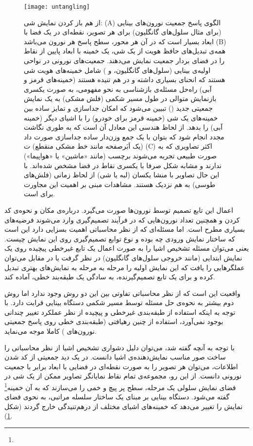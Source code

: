 \begin{figure}
\centering
{\footnotesize
\texttt{[image: untangling]}
\caption[از هم باز کردن نمایش شی]{از هم باز کردن نمایش شی: (A) الگوی پاسخ جمعیت نورون‌های بینایی (برای مثال سلول‌های گانگلیون) برای هر تصویر، نقطه‌ای در یک فضا با ابعاد بسیار است که در آن هر محور، سطح پاسخ هر نورون می‌باشد
(B) همه‌ی تبدیل‌های حافظ هویت از یک شی، یک خمینه با ابعاد پایین از نقاط را در فضای بردار جمعیت نمایش می‌دهند. جمعیت‌های نورونی در نواحی اولیه‌ی بینایی (سلول‌های گانگلیون،  و ) شامل خمینه‌های هویت شی هستند که انحنای بسیاری داشته و در هم تنیده هستند (خمینه‌های قرمز و آبی) راه‌حل مسئله‌ی بازشناسی به نحو مفهومی، به صورت یکسری بازنمایش متوالی در طول مسیر شکمی (فلش مشکی) به یک نمایش جمعیتی جدید () تبیین می‌شود که امکان جداسازی و تمایز ساده بین خمینه‌های یک شی (خمینه قرمز برای خودرو) را با اشیای دیگر (خمینه آبی) را بدهد. از لحاظ هندسی این معادل آن است که به طوری نگاشت مجدد انجام شود که بتوان با یک جمع وزن‌دار ساده جداسازی صورت داد (یک اَبَرصفحه مانند خط مشکی منقطع) ت
(C) اکثر تصاویری که به صورت طبیعی تجربه می‌شوند برچسب (مانند «ماشین» یا «هواپیما») ندارند و مشابه شکل صرفا با یکسری نقاط در فضا مشخص شده‌اند. با این حال تصاویر با منشا یکسان (لبه یا شی) از لحاظ زمانی (فلش‌های طوسی) به هم نزدیک هستند. مشاهدات مبنی بر اهمیت این مجاورت برای  است.\cite{dicarlo2012does}}
\label{fig:untangling}
}
\end{figure}

اعمال این تابع تصمیم توسط نورون‌ها صورت می‌گیرد. درباره‌ی مکان و نحوه‌ی کد کردن و همچنین تعداد نورون‌هایی که در فرآیند تصمیم‌گیری وارد می‌شوند فرضیه‌های بسیاری مطرح است. اما مسئله‌ای که از نظر محاسباتی اهمیت بسزایی دارد این است که ساختار نمایش ورودی چه بوده و نوع توابع تصمیم‌گیری روی این نمایش چیست. یعنی می‌توان مسئله تشخیص اشیا را به صورت اعمال یک تابع غیرخطی پیچیده روی یک نمایش ابتدایی (مانند خروجی سلول‌های گانگلیون) در نظر گرفت یا در مقابل می‌توان عملگرهایی را یافت که این نمایش اولیه را مرحله به مرحله به نمایش‌های بهتری تبدیل کرده و برای یک تابع تصمیم‌گیرنده، به سادگی یک طبقه‌بند خطی، آماده کند.

واقعیت این است که از نظر محاسباتی تفاوتی بین این دو روش وجود ندارد اما روش دوم بیشتر به نحوه‌ی حل مسئله توسط مسیر شکمی دستگاه بینایی قرابت دارد. با توجه به اینکه استفاده از طبقه‌بندی غیرخطی و پیچیده از نظر عملکرد تغییر چندانی بوجود نمی‌آورد، استفاده از چنین رهیافتی (طبقه‌بندی خطی روی پاسخ جمعیتی نورون‌های ) کاملا موجه می‌نماید.

با توجه به آنچه گفته شد، می‌توان دلیل دشواری تشخیص اشیا از نظر محاسباتی را ساخت صور مناسب نمایش‌دهنده‌ی اشیا دانست. در یک دید جمعیتی از کد شدن اطلاعات، می‌توان هر تصویر را به صورت نقطه‌ای در فضایی با ابعاد برابر با جمعیت نورونی دانست. از این رو، مجموعه‌ی تمام نقاط نمایانگر تصاویر ممکن از یک شی در فضای نمایش سلولی یک مرحله، سطح پر پیچ و خمی را می‌سازند که به آن خمینه\footnote{} گفته می‌شود. دستگاه بینایی بر مبنای یک ساختار سلسله مراتبی، به نحوی فضای نمایش را تغییر می‌دهد که خمینه‌های اشیای مختلف از درهم‌تنیدگی خارج گردند\cite{dicarlo2012does} (شکل \ref{fig:untangling}).

